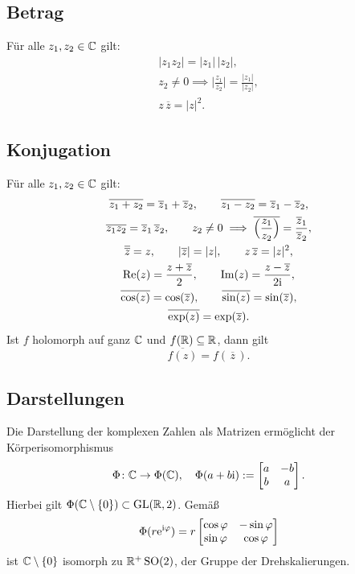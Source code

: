 \subsection{Betrag}
Für alle $z_1,z_2\in\mathbb C$ gilt:
\begin{gather}
|z_1z_2| = |z_1|\,|z_2|,\\
z_2\ne 0\implies \Big|\frac{z_1}{z_2}\Big|
= \frac{|z_1|}{|z_2|},\\
z\,\overline z = |z|^2.
\end{gather}

\subsection{Konjugation}
Für alle $z_1,z_2\in\mathbb C$ gilt:
\begin{gather}
\overline{z_1+z_2} = \overline z_1+\overline z_2,\qquad
\overline{z_1-z_2} = \overline z_1-\overline z_2,\\
\overline{z_1 z_2} = \overline z_1\,\overline z_2,\qquad
z_2\ne 0 \implies \overline{\Big(\frac{z_1}{z_2}\Big)}
= \frac{\overline z_1}{\overline z_2},\\
\overline{\overline z}=z,\qquad
|\overline{z}| = |z|,\qquad
z\,\overline z = |z|^2,\\
\operatorname{Re}(z) = \frac{z+\overline z}{2},\qquad
\operatorname{Im}(z) = \frac{z-\overline z}{2\mathrm i},\\
\overline{\cos(z)} = \cos(\overline z),\qquad
\overline{\sin(z)} = \sin(\overline z),\\
\overline{\exp(z)} = \exp(\overline z).
\end{gather}
Ist $f$ holomorph auf ganz $\mathbb C$ und $f(\mathbb R)\subseteq\mathbb R$, dann gilt
\begin{equation}
\overline{f(z)} = f(\,\overline z\,).
\end{equation}

\subsection{Darstellungen}
Die Darstellung der komplexen Zahlen als Matrizen
ermöglicht der Körperisomorphismus
\begin{equation}
\Phi\colon\mathbb C\to\Phi(\mathbb C),
\quad \Phi(a+b\mathrm i) := \begin{bmatrix}a & -b\\ b & a\end{bmatrix}.
\end{equation}
Hierbei gilt $\Phi(\mathbb C\setminus\{0\})\subset\operatorname{GL}(\mathbb R,2)$. Gemäß
\begin{equation}
\Phi(r\mathrm e^{\mathrm i\varphi}) = r\begin{bmatrix}
\cos\varphi & -\sin\varphi\\
\sin\varphi & \cos\varphi
\end{bmatrix}
\end{equation}
ist $\mathbb C\setminus\{0\}$ isomorph zu $\mathbb R^+\operatorname{SO}(2)$,
der Gruppe der Drehskalierungen.

